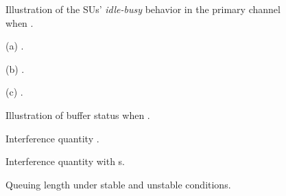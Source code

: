 \documentclass[11pt,draftcls]{IEEEtran}{\onecolumn}
\begin{document}
\begin{figure}[!h]
\centering
  \vspace{-0.5cm}
  \caption{Illustration of the SUs' \emph{idle-busy} behavior in the primary channel when .}\label{fig7}
\end{figure}

\begin{figure}[!h]
\begin{minipage}[t]{.5\linewidth}
  \centering
  \centerline{}
  \vspace{-0.3cm}
  \centerline{\scriptsize{(a) .}}
\end{minipage}
\hfill
\begin{minipage}[t]{0.5\linewidth}
  \centering
  \centerline{}
  \vspace{-0.3cm}
  \centerline{\scriptsize{(b)  .}}\vspace{0.5cm}
\end{minipage}
\begin{minipage}[t]{1.0\linewidth}
  \centering
  \centerline{}
  \vspace{-0.3cm}
  \centerline{\scriptsize{(c)  .}}\medskip
\end{minipage}
\caption{Illustration of buffer status  when .}\label{fig8}
\end{figure}

\begin{figure}[!h]
\begin{minipage}[t]{0.5\linewidth}
  \centering
  \centerline{}
  \vspace{-0.5cm}
  \caption{Interference quantity .}\vspace{-0.01cm}\label{fig9}
\end{minipage}
\hfill
\begin{minipage}[t]{0.5\linewidth}
  \centering
  \centerline{}
  \vspace{-0.5cm}
  \caption{Interference quantity  with s.}\vspace{-0.01cm}\label{fig10}
\end{minipage}
\end{figure}

\begin{figure}[!h]
  \centering
  \centerline{}
  \vspace{-0.5cm}
  \caption{Queuing length under stable and unstable conditions.}\label{fig11}\vspace{-0.01cm}
\end{figure}
\end{document}
